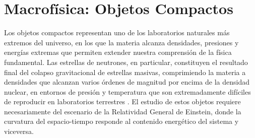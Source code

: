









\chapter{Macrofísica: Objetos Compactos}

Los objetos compactos representan uno de los laboratorios naturales más extremos del universo, en los que la materia alcanza densidades, presiones y energías extremas que permiten extender nuestra comprensión de la física fundamental. Las estrellas de neutrones, en particular, constituyen el resultado final del colapso gravitacional de estrellas masivas, comprimiendo la materia a densidades que alcanzan varios órdenes de magnitud por encima de la densidad nuclear, en entornos de presión y temperatura que son extremadamente difíciles de reproducir en laboratorios terrestres \cite{baadeSuperNovae1934}. El estudio de estos objetos requiere necesariamente del escenario de la Relatividad General de Einstein, donde la curvatura del espacio-tiempo responde al contenido energético del sistema y viceversa.

